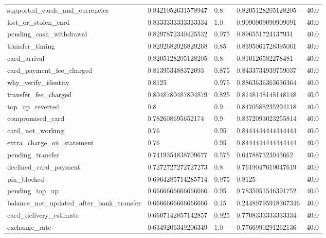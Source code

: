 \begin{table}[!ht]
\begin{tabularx}{\textwidth}{X l l l l}
supported\_cards\_and\_currencies & \num{0.8421052631578947} & \num{0.8} & \num{0.8205128205128205} & \num{40.0} \\
lost\_or\_stolen\_card & \num{0.8333333333333334} & \num{1.0} & \num{0.9090909090909091} & \num{40.0} \\
pending\_cash\_withdrawal & \num{0.8297872340425532} & \num{0.975} & \num{0.896551724137931} & \num{40.0} \\
transfer\_timing & \num{0.8292682926829268} & \num{0.85} & \num{0.8395061728395061} & \num{40.0} \\
card\_arrival & \num{0.8205128205128205} & \num{0.8} & \num{0.810126582278481} & \num{40.0} \\
card\_payment\_fee\_charged & \num{0.813953488372093} & \num{0.875} & \num{0.8433734939759037} & \num{40.0} \\
why\_verify\_identity & \num{0.8125} & \num{0.975} & \num{0.8863636363636364} & \num{40.0} \\
transfer\_fee\_charged & \num{0.8048780487804879} & \num{0.825} & \num{0.8148148148148148} & \num{40.0} \\
top\_up\_reverted & \num{0.8} & \num{0.9} & \num{0.8470588235294118} & \num{40.0} \\
compromised\_card & \num{0.782608695652174} & \num{0.9} & \num{0.8372093023255814} & \num{40.0} \\
card\_not\_working & \num{0.76} & \num{0.95} & \num{0.8444444444444444} & \num{40.0} \\
extra\_charge\_on\_statement & \num{0.76} & \num{0.95} & \num{0.8444444444444444} & \num{40.0} \\
pending\_transfer & \num{0.7419354838709677} & \num{0.575} & \num{0.647887323943662} & \num{40.0} \\
declined\_card\_payment & \num{0.7272727272727273} & \num{0.8} & \num{0.7619047619047619} & \num{40.0} \\
pin\_blocked & \num{0.6964285714285714} & \num{0.975} & \num{0.8125} & \num{40.0} \\
pending\_top\_up & \num{0.6666666666666666} & \num{0.95} & \num{0.7835051546391752} & \num{40.0} \\
balance\_not\_updated\_after\_bank\_transfer & \num{0.6666666666666666} & \num{0.15} & \num{0.24489795918367346} & \num{40.0} \\
card\_delivery\_estimate & \num{0.6607142857142857} & \num{0.925} & \num{0.7708333333333334} & \num{40.0} \\
exchange\_rate & \num{0.6349206349206349} & \num{1.0} & \num{0.7766990291262136} & \num{40.0} \\

\end{tabularx}
\end{table}

